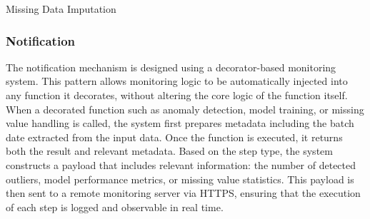 \begin{algorithm}[H]
    \caption{Missing Data Imputation}
    \label{alg:imputation}
    
\end{algorithm}

\subsubsection{Notification}
The notification mechanism is designed using a decorator-based monitoring system. This pattern allows monitoring logic to be automatically injected into any function it decorates, without altering the core logic of the function itself. When a decorated function such as anomaly detection, model training, or missing value handling is called, the system first prepares metadata including the batch date extracted from the input data. Once the function is executed, it returns both the result and relevant metadata. Based on the step type, the system constructs a payload that includes relevant information: the number of detected outliers, model performance metrics, or missing value statistics. This payload is then sent to a remote monitoring server via HTTPS, ensuring that the execution of each step is logged and observable in real time.

